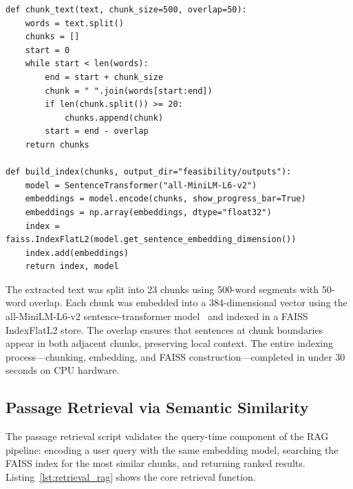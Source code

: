 \documentclass[12pt,a4paper]{article}
\begin{document}
\begin{lstlisting}[caption={Text chunking and FAISS index construction},label=lst:indexing]
def chunk_text(text, chunk_size=500, overlap=50):
    words = text.split()
    chunks = []
    start = 0
    while start < len(words):
        end = start + chunk_size
        chunk = " ".join(words[start:end])
        if len(chunk.split()) >= 20:
            chunks.append(chunk)
        start = end - overlap
    return chunks

def build_index(chunks, output_dir="feasibility/outputs"):
    model = SentenceTransformer("all-MiniLM-L6-v2")
    embeddings = model.encode(chunks, show_progress_bar=True)
    embeddings = np.array(embeddings, dtype="float32")
    index = faiss.IndexFlatL2(model.get_sentence_embedding_dimension())
    index.add(embeddings)
    return index, model
\end{lstlisting}

The extracted text was split into 23 chunks using 500-word segments with 50-word overlap. Each chunk was embedded into a 384-dimensional vector using the all-MiniLM-L6-v2 sentence-transformer model~\citep{reimers2019sbert} and indexed in a FAISS IndexFlatL2 store. The overlap ensures that sentences at chunk boundaries appear in both adjacent chunks, preserving local context. The entire indexing process---chunking, embedding, and FAISS construction---completed in under 30 seconds on CPU hardware.

\subsection{Passage Retrieval via Semantic Similarity}

The passage retrieval script validates the query-time component of the RAG pipeline: encoding a user query with the same embedding model, searching the FAISS index for the most similar chunks, and returning ranked results. Listing~\ref{lst:retrieval_rag} shows the core retrieval function.
\end{document}
